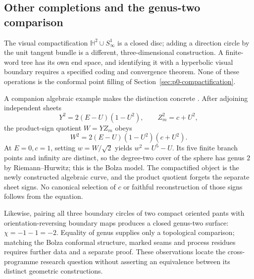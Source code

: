 \subsection{Other completions and the genus-two comparison}

The visual compactification $\mathbb H^2\cup S^1_\infty$ is a closed disc;
adding a direction circle by the unit tangent bundle is a different,
three-dimensional construction.  A finite-word tree has its own end space,
and identifying it with a hyperbolic visual boundary requires a specified
coding and convergence theorem.  None of these operations is the conformal
point filling of Section~\ref{sec:p0-compactification}.

A companion algebraic example makes the distinction concrete
\cite{Yuan2026ObserverMetricCompletion}.  After adjoining independent sheets
\[
 Y^2=2(E-U)(1-U^2),\qquad Z_m^2=c+U^2,
\]
the product-sign quotient $W=YZ_m$ obeys
\[
 W^2=2(E-U)(1-U^2)(c+U^2).
\]
At $E=0,c=1$, setting $w=W/\sqrt2$ yields $w^2=U^5-U$.
Its five finite branch points and infinity are distinct, so the degree-two
cover of the sphere has genus $2$ by Riemann--Hurwitz; this is the Bolza model.
The compactified object is the newly constructed algebraic curve, and the
product quotient forgets the separate sheet signs.  No canonical selection of
$c$ or faithful reconstruction of those signs follows from the equation.

Likewise, pairing all three boundary circles of two compact oriented pants
with orientation-reversing boundary maps produces a closed genus-two surface:
$\chi=-1-1=-2$.  Equality of genus supplies only a topological comparison;
matching the Bolza conformal structure, marked seams and process residues
requires further data and a separate proof.  These observations locate the
cross-programme research question without asserting an equivalence between
its distinct geometric constructions.
